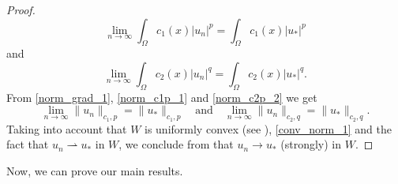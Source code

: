 \documentclass[pdflatex,sn-mathphys-num]{sn-jnl}
\theoremstyle{thmstyleone}%
\theoremstyle{thmstyletwo}%
\theoremstyle{thmstylethree}%
\theoremstyle{thmstylethree}%
\begin{document}
\begin{proof}
\begin{equation}\label{norm_c1p_1}
    \lim_{n\to \infty} \int_\Omega c_1 (x)|u_n|^p  = \int_\Omega c_1 (x)|u_*|^p 
\end{equation}
and
\begin{equation}\label{norm_c2p_2}
    \lim_{n\to \infty} \int_\Omega c_2 (x)|u_n|^q  = \int_\Omega c_2 (x)|u_*|^q .
\end{equation}
From \eqref{norm_grad_1}, \eqref{norm_c1p_1} and \eqref{norm_c2p_2} we get
\begin{equation}\label{conv_norm_1}
    \lim_{n\to \infty} \|u_n\|_{c_1,p}=\|u_*\|_{c_1,p} \quad \text{and} \quad     \lim_{n\to \infty} \|u_n\|_{c_2,q}=\|u_*\|_{c_2,q}.
\end{equation}
Taking into account that $W$ is uniformly convex (see  \cite[Proposition 2.4.7]{GP2}),  \eqref{conv_norm_1} and the fact that $u_n \rightharpoonup u_*$ in $W$, we conclude from \cite[Proposition 3.32]{brezis} that $u_n \to u_*$ (strongly) in $W$. 
\end{proof}

Now, we can prove our main results. 
\end{document}
